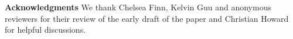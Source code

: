 
{\bf Acknowledgments} We thank Chelsea Finn, Kelvin Guu and anonymous reviewers for their review of the early draft of the paper and Christian Howard for helpful discussions.
